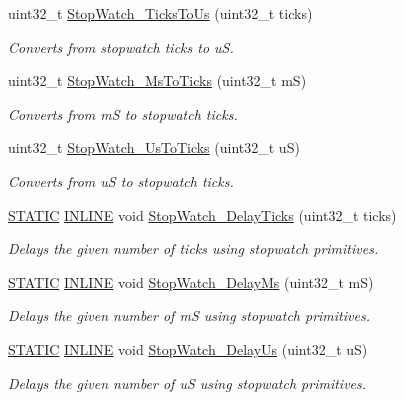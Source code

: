 \begin{DoxyCompactItemize}
uint32\+\_\+t \hyperlink{group___stop___watch_ga76fc3c7b473615677932efe3e5d0e142}{Stop\+Watch\+\_\+\+Ticks\+To\+Us} (uint32\+\_\+t ticks)
\begin{DoxyCompactList}\small\item\em Converts from stopwatch ticks to uS. \end{DoxyCompactList}\item 
uint32\+\_\+t \hyperlink{group___stop___watch_ga00f0c8411acd07344c7dd3cac8ec6d3e}{Stop\+Watch\+\_\+\+Ms\+To\+Ticks} (uint32\+\_\+t mS)
\begin{DoxyCompactList}\small\item\em Converts from mS to stopwatch ticks. \end{DoxyCompactList}\item 
uint32\+\_\+t \hyperlink{group___stop___watch_ga65ab3801fdb76aab8879a0698fc4df45}{Stop\+Watch\+\_\+\+Us\+To\+Ticks} (uint32\+\_\+t uS)
\begin{DoxyCompactList}\small\item\em Converts from uS to stopwatch ticks. \end{DoxyCompactList}\item 
\hyperlink{group___l_p_c___types___public___macros_ga10b2d890d871e1489bb02b7e70d9bdfb}{S\+T\+A\+T\+IC} \hyperlink{spifi__18xx__43xx_8h_a2eb6f9e0395b47b8d5e3eeae4fe0c116}{I\+N\+L\+I\+NE} void \hyperlink{group___stop___watch_ga744f358982209fe277eb21843e88a2d9}{Stop\+Watch\+\_\+\+Delay\+Ticks} (uint32\+\_\+t ticks)
\begin{DoxyCompactList}\small\item\em Delays the given number of ticks using stopwatch primitives. \end{DoxyCompactList}\item 
\hyperlink{group___l_p_c___types___public___macros_ga10b2d890d871e1489bb02b7e70d9bdfb}{S\+T\+A\+T\+IC} \hyperlink{spifi__18xx__43xx_8h_a2eb6f9e0395b47b8d5e3eeae4fe0c116}{I\+N\+L\+I\+NE} void \hyperlink{group___stop___watch_gaa3bfba465962b310e4a5bd18292e8f87}{Stop\+Watch\+\_\+\+Delay\+Ms} (uint32\+\_\+t mS)
\begin{DoxyCompactList}\small\item\em Delays the given number of mS using stopwatch primitives. \end{DoxyCompactList}\item 
\hyperlink{group___l_p_c___types___public___macros_ga10b2d890d871e1489bb02b7e70d9bdfb}{S\+T\+A\+T\+IC} \hyperlink{spifi__18xx__43xx_8h_a2eb6f9e0395b47b8d5e3eeae4fe0c116}{I\+N\+L\+I\+NE} void \hyperlink{group___stop___watch_ga3bc7706d1a9cb32888f82b2874c3655c}{Stop\+Watch\+\_\+\+Delay\+Us} (uint32\+\_\+t uS)
\begin{DoxyCompactList}\small\item\em Delays the given number of uS using stopwatch primitives. \end{DoxyCompactList}\end{DoxyCompactItemize}


